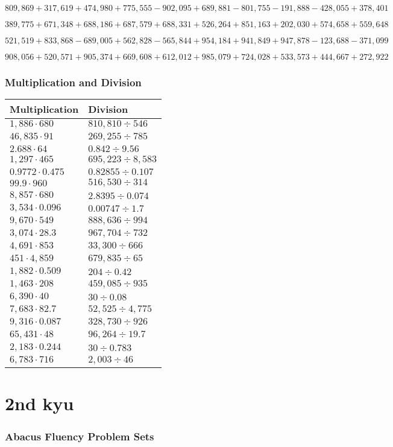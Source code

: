 \(809,869+317,619+474,980+775,555-902,095+689,881-801,755-191,888-428,055+378,401\)

\(389,775+671,348+688,186+687,579+688,331+526,264+851,163+202,030+574,658+559,648\)

\(521,519+833,868-689,005+562,828-565,844+954,184+941,849+947,878-123,688-371,099\)

\(908,056+520,571+905,374+669,608+612,012+985,079+724,028+533,573+444,667+272,922\)

\hypertarget{multiplication-and-division-354}{%
\subsubsection{Multiplication and
Division}\label{multiplication-and-division-354}}

\begin{longtable}[]{@{}ll@{}}
\toprule
Multiplication & Division\tabularnewline
\midrule
\endhead
\(1,886\cdot680\) & \(810,810÷546\)\tabularnewline
\(46,835\cdot91\) & \(269,255÷785\)\tabularnewline
\(2.688\cdot64\) & \(0.842÷9.56\)\tabularnewline
\(1,297\cdot465\) & \(695,223÷8,583\)\tabularnewline
\(0.9772\cdot0.475\) & \(0.82855÷0.107\)\tabularnewline
\(99.9\cdot960\) & \(516,530÷314\)\tabularnewline
\(8,857\cdot680\) & \(2.8395÷0.074\)\tabularnewline
\(3,534\cdot0.096\) & \(0.00747÷1.7\)\tabularnewline
\(9,670\cdot549\) & \(888,636÷994\)\tabularnewline
\(3,074\cdot28.3\) & \(967,704÷732\)\tabularnewline
\(4,691\cdot853\) & \(33,300÷666\)\tabularnewline
\(451\cdot4,859\) & \(679,835÷65\)\tabularnewline
\(1,882\cdot0.509\) & \(204÷0.42\)\tabularnewline
\(1,463\cdot208\) & \(459,085÷935\)\tabularnewline
\(6,390\cdot40\) & \(30÷0.08\)\tabularnewline
\(7,683\cdot82.7\) & \(52,525÷4,775\)\tabularnewline
\(9,316\cdot0.087\) & \(328,730÷926\)\tabularnewline
\(65,431\cdot48\) & \(96,264÷19.7\)\tabularnewline
\(2,183\cdot0.244\) & \(30÷0.783\)\tabularnewline
\(6,783\cdot716\) & \(2,003÷46\)\tabularnewline
\bottomrule
\end{longtable}

\hypertarget{nd-kyu}{%
\section{2nd kyu}\label{nd-kyu}}

\hypertarget{abacus-fluency-problem-sets-6}{%
\subsubsection{Abacus Fluency Problem
Sets}\label{abacus-fluency-problem-sets-6}}

